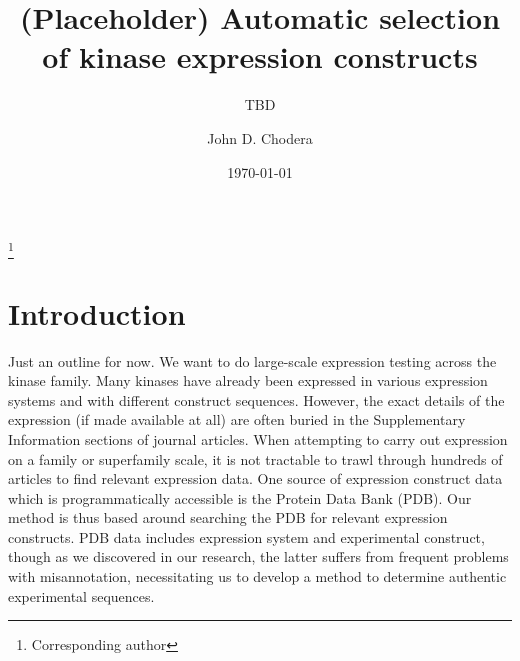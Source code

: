 \documentclass[aps,pre,twocolumn,nofootinbib,superscriptaddress,linenumbers]{revtex4-1}
\begin{document}
\title{(Placeholder) Automatic selection of kinase expression constructs}

\author{TBD}
\author{John D. Chodera}
 \thanks{Corresponding author}

\date{\today}

\begin{abstract}

\end{abstract}

\maketitle

\section{Introduction}
\label{section:introduction}

{\color{blue} Just an outline for now.}
We want to do large-scale expression testing across the kinase family.
Many kinases have already been expressed in various expression systems and with different construct sequences.
However, the exact details of the expression (if made available at all) are often buried in the Supplementary Information sections of journal articles.
When attempting to carry out expression on a family or superfamily scale, it is not tractable to trawl through hundreds of articles to find relevant expression data.
One source of expression construct data which is programmatically accessible is the Protein Data Bank (PDB).
Our method is thus based around searching the PDB for relevant expression constructs.
PDB data includes expression system and experimental construct, though as we discovered in our research, the latter suffers from frequent problems with misannotation, necessitating us to develop a method to determine authentic experimental sequences.
\end{document}
